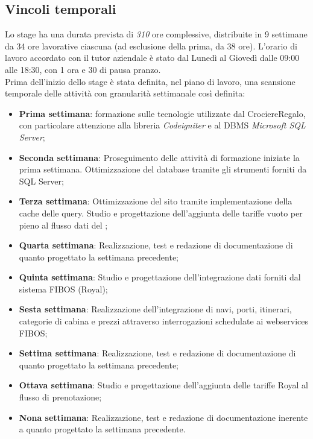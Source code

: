 \subsection{Vincoli temporali}
\label{sec:vincoli-temporali}
Lo stage ha una durata prevista di \textit{310} ore complessive, distribuite in 9 settimane da 34 ore lavorative ciascuna (ad esclusione della prima, da 38 ore). L'orario di lavoro accordato con il tutor aziendale è stato dal Lunedì al Giovedì dalle 09:00 alle 18:30, con 1 ora e 30 di pausa pranzo. \\
Prima dell'inizio dello stage è stata definita, nel piano di lavoro, una scansione temporale delle attività con granularità settimanale così definita:
\begin{itemize}
	\item \textbf{Prima settimana}: formazione sulle tecnologie utilizzate dal \bookingEngine CrociereRegalo, con particolare attenzione alla libreria \textit{Codeigniter} e al \gls{DBMS} \textit{Microsoft SQL Server};
	\item \textbf{Seconda settimana}: Proseguimento delle attività di formazione iniziate la prima settimana. Ottimizzazione del database tramite gli strumenti forniti da SQL Server;
	\item \textbf{Terza settimana}: Ottimizzazione del sito tramite implementazione della cache delle query. Studio e progettazione dell'aggiunta delle tariffe vuoto per pieno al flusso dati del \bookingEngine;
	\item \textbf{Quarta settimana}: Realizzazione, test e redazione di documentazione di quanto progettato la settimana precedente;
	\item \textbf{Quinta settimana}: Studio e progettazione dell'integrazione dati forniti dal sistema FIBOS (Royal);
	\item \textbf{Sesta settimana}: Realizzazione dell'integrazione di navi, porti, itinerari, categorie di cabina e prezzi attraverso interrogazioni schedulate ai \glspl{webservice} FIBOS;
	\item \textbf{Settima settimana}: Realizzazione, test e redazione di documentazione di quanto progettato la settimana precedente;
	\item \textbf{Ottava settimana}: Studio e progettazione dell'aggiunta delle tariffe Royal al flusso di prenotazione;
	\item \textbf{Nona settimana}: Realizzazione, test e redazione di documentazione inerente a quanto progettato la settimana precedente.
\end{itemize}

